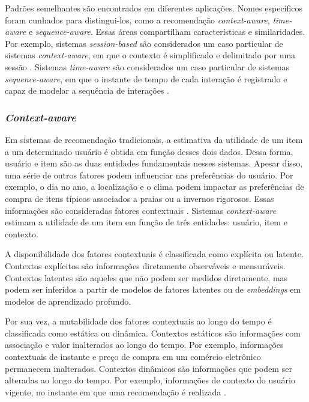 Padrões semelhantes são encontrados em diferentes aplicações. Nomes específicos
foram cunhados para distingui-los, como a recomendação \textit{context-aware},
\textit{time-aware} e \textit{sequence-aware}. Essas áreas compartilham
características e similaridades. Por exemplo, sistemas \textit{session-based}
são considerados um caso particular de sistemas \textit{context-aware}, em que o
contexto é simplificado e delimitado por uma sessão \cite{survey_wang_2021}.
Sistemas \textit{time-aware} são considerados um caso particular de sistemas
\textit{sequence-aware}, em que o instante de tempo de cada interação é
registrado e capaz de modelar a sequência de interações
\cite{ludewig2020advances}.

\subsubsection{\textit{Context-aware}} 

Em sistemas de recomendação tradicionais, a estimativa da utilidade de um item a
um determinado usuário é obtida em função desses dois dados. Dessa forma,
usuário e item são as duas entidades fundamentais nesses sistemas. Apesar disso,
uma série de outros fatores podem influenciar nas preferências do usuário. Por
exemplo, o dia no ano, a localização e o clima podem impactar as preferências de
compra de itens típicos associados a praias ou a invernos rigorosos. Essas
informações são consideradas fatores contextuais \cite{rec_sys_handbook_2022_context}.
Sistemas \textit{context-aware} estimam a utilidade de um item em função de três
entidades: usuário, item e contexto.

A disponibilidade dos fatores contextuais é classificada como explícita ou
latente. Contextos explícitos são informações diretamente observáveis e
mensuráveis. Contextos latentes são aqueles que não podem ser medidos
diretamente, mas podem ser inferidos a partir de modelos de fatores latentes ou
de \textit{embeddings} em modelos de aprendizado profundo.

Por sua vez, a mutabilidade dos fatores contextuais ao longo do tempo é
classificada como estática ou dinâmica. Contextos estáticos são informações com
associação e valor inalterados ao longo do tempo. Por exemplo, informações
contextuais de instante e preço de compra em um comércio eletrônico permanecem
inalterados. Contextos dinâmicos são informações que podem ser alteradas ao
longo do tempo. Por exemplo, informações de contexto do usuário vigente, no
instante em que uma recomendação é realizada
\cite{rec_sys_handbook_2022_context}.

